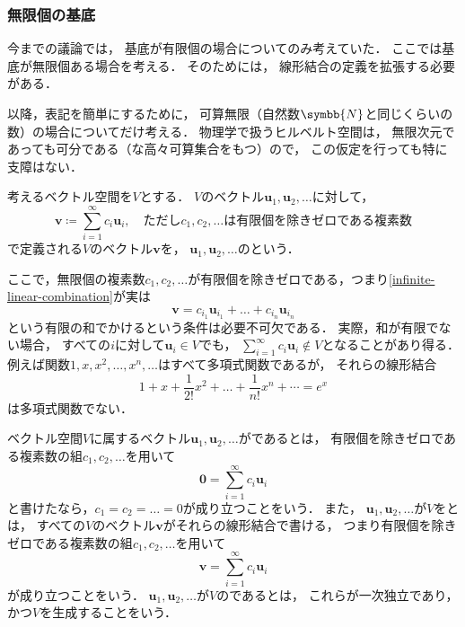 \documentclass[
]{sotsu}
\newcommand{\fire}[1]{\textcolor{fire}{#1}}
\begin{document}
\subsubsection{無限個の基底}

今までの議論では，
基底が有限個の場合についてのみ考えていた．
ここでは基底が無限個ある場合を考える．
そのためには，
線形結合の定義を拡張する必要がある．

以降，表記を簡単にするために，
可算無限（自然数$\symbb{N}$と同じくらいの数）の場合についてだけ考える．
物理学で扱うヒルベルト空間は，
無限次元であっても可分である（な高々可算集合をもつ）ので，
この仮定を行っても特に支障はない．

考えるベクトル空間を$V$とする．
$V$のベクトル$\symbf{u}_1, \symbf{u}_2, \dots$に対して，
\begin{equation}
    \label{eq:infinite-linear-combination}
    \symbf{v} \coloneq
    \sum_{i = 1}^{\infty} c_i \symbf{u}_i,
    \quad
    \text{ただし$c_1, c_2, \dots$は有限個を除きゼロである複素数}
\end{equation}
で定義される$V$のベクトル$\symbf{v}$を，
$\symbf{u}_1, \symbf{u}_2, \dots$のという．

ここで，無限個の複素数$c_1, c_2, \dots$が有限個を除きゼロである，つまり\cref{infinite-linear-combination}が実は
\begin{equation*}
    \symbf{v} = c_{i_1} \symbf{u}_{i_1} + \dots + c_{i_n} \symbf{u}_{i_n}
\end{equation*}
という有限の和でかけるという条件は必要不可欠である．
実際，和が有限でない場合，
すべての$i$に対して$\symbf{u}_i \in V$でも，
$\sum_{i=1}^{\infty} c_i \symbf{u}_i \notin V$となることがあり得る．
例えば関数$1, x, x^2, \dots, x^n, \dots$はすべて多項式関数であるが，
それらの線形結合
\begin{equation*}
    1 + x + \frac{1}{2!} x^2 + \dots + \frac{1}{n!} x^n + \dotsb = e^x
\end{equation*}
は多項式関数でない．

ベクトル空間$V$に属するベクトル$\symbf{u}_1, \symbf{u}_2, \dots$がであるとは，
\fire{有限個を除きゼロである}複素数の組$c_1, c_2, \dots$を用いて
\begin{equation*}
    \symbf{0} = \sum_{i = 1}^{\infty} c_i \symbf{u}_i
\end{equation*}
と書けたなら，$c_1 = c_2 = \dots = 0$が成り立つことをいう．
また，
$\symbf{u}_1, \symbf{u}_2, \dots$が$V$をとは，
すべての$V$のベクトル$\symbf{v}$がそれらの線形結合で書ける，
つまり\fire{有限個を除きゼロである}複素数の組$c_1, c_2, \dots$を用いて
\begin{equation*}
    \symbf{v} = \sum_{i = 1}^{\infty} c_i \symbf{u}_i
\end{equation*}
が成り立つことをいう．
$\symbf{u}_1, \symbf{u}_2, \dots$が$V$のであるとは，
これらが一次独立であり，
かつ$V$を生成することをいう．
\end{document}
